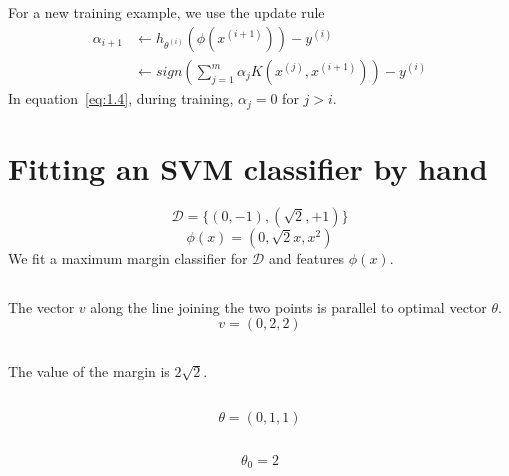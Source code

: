 \documentclass{article}
\begin{document}
\subsection{}
For a new training example, we use the update rule
\begin{equation}
  \label{eq:1.4}
  \begin{split}
   \alpha_{i+1} &\leftarrow h_{\theta^{(i)}}(\phi(x^{(i+1)})) - y^{(i)} \\
   			&\leftarrow sign\left(\sum_{j=1}^{m} \alpha_j K( x^{(j)}, x^{(i+1)} )\right) - y^{(i)}
  \end{split}
\end{equation}
In equation~\ref{eq:1.4}, during training, $\alpha_j = 0$ for $j > i$.


\section{Fitting an SVM classifier by hand}
\begin{equation*}
	\mathcal{D} = \{ (0,-1) , (\sqrt{2},+1) \} 
\end{equation*}
\begin{equation*}
	\phi(x) = (0,\sqrt{2}x,x^2) 
\end{equation*}
We fit a maximum margin classifier for $\mathcal{D}$ and features $\phi(x)$.

\subsection{}
The vector $v$ along the line joining the two points is parallel to optimal vector $\theta$.
\begin{equation*}
	v = (0,2,2)
\end{equation*}

\subsection{}
The value of the margin is $2\sqrt{2}$.

\subsection{}
\begin{equation*}
	\theta = (0,1,1)
\end{equation*}

\subsection{}
\begin{equation*}
	\theta_0 = 2
\end{equation*}
\end{document}
